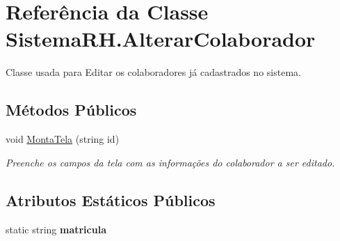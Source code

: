 \hypertarget{class_sistema_r_h_1_1_alterar_colaborador}{
\section{Referência da Classe SistemaRH.AlterarColaborador}
\label{class_sistema_r_h_1_1_alterar_colaborador}
}


Classe usada para Editar os colaboradores já cadastrados no sistema.  


\subsection*{Métodos Públicos}
\begin{DoxyCompactItemize}
\item 
void \hyperlink{class_sistema_r_h_1_1_alterar_colaborador_a038ea8fc6f180b32091cca1df75c8fc3}{MontaTela} (string id)
\begin{DoxyCompactList}\small\item\em Preenche os campos da tela com as informações do colaborador a ser editado. \item\end{DoxyCompactList}\end{DoxyCompactItemize}
\subsection*{Atributos Estáticos Públicos}
\begin{DoxyCompactItemize}
\item 
\hypertarget{class_sistema_r_h_1_1_alterar_colaborador_a0fefc7d208230714175315fdc6bc4289}{
static string {\bfseries matricula}}
\label{class_sistema_r_h_1_1_alterar_colaborador_a0fefc7d208230714175315fdc6bc4289}

\end{DoxyCompactItemize}
